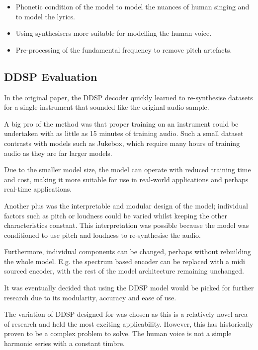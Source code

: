 \begin{itemize}
    \item Phonetic condition of the model to model the nuances of human singing and to model the lyrics.
    \item Using synthesisers more suitable for modelling the human voice.
    \item Pre-processing of the fundamental frequency to remove pitch artefacts.
\end{itemize}

\subsection{DDSP Evaluation}

In the original paper, the DDSP decoder quickly learned to re-synthesise datasets for a single instrument that sounded like the original audio sample.

A big pro of the method was that proper training on an instrument could be undertaken with as little as 15 minutes of training audio. Such a small dataset contrasts with models such as Jukebox, which require many hours of training audio as they are far larger models.

Due to the smaller model size, the model can operate with reduced training time and cost, making it more suitable for use in real-world applications and perhaps real-time applications.

Another plus was the interpretable and modular design of the model; individual factors such as pitch or loudness could be varied whilst keeping the other characteristics constant. This interpretation was possible because the model was conditioned to use pitch and loudness to re-synthesise the audio.

Furthermore, individual components can be changed, perhaps without rebuilding the whole model. E.g. the spectrum based encoder can be replaced with a midi sourced encoder, with the rest of the model architecture remaining unchanged.

It was eventually decided that using the DDSP model would be picked for further research due to its modularity, accuracy and ease of use.

The variation of DDSP designed for  was chosen as this is a relatively novel area of research and held the most exciting applicability. However, this has historically proven to be a complex problem to solve. The human voice is not a simple harmonic series with a constant timbre.
